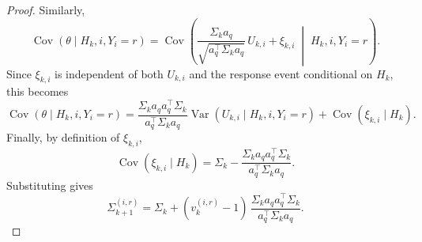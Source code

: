 \documentclass{article}
\begin{document}
\begin{proof}
Similarly,
\begin{equation*}
\operatorname{Cov}(\theta\mid H_k,i,Y_i=r)
=
\operatorname{Cov}\!\left(
\frac{\Sigma_k a_q}{\sqrt{a_q^\top\Sigma_k a_q}}\,U_{k,i}
+\xi_{k,i}
\;\middle|\;H_k,i,Y_i=r
\right).
\end{equation*}
Since $\xi_{k,i}$ is independent of both $U_{k,i}$ and the response event conditional on $H_k$,
this becomes
\begin{equation*}
\operatorname{Cov}(\theta\mid H_k,i,Y_i=r)
=
\frac{\Sigma_k a_q a_q^\top\Sigma_k}{a_q^\top\Sigma_k a_q}
\operatorname{Var}(U_{k,i}\mid H_k,i,Y_i=r)
+
\operatorname{Cov}(\xi_{k,i}\mid H_k).
\end{equation*}
Finally, by definition of $\xi_{k,i}$,
\begin{equation*}
\operatorname{Cov}(\xi_{k,i}\mid H_k)
=
\Sigma_k-
\frac{\Sigma_k a_q a_q^\top\Sigma_k}{a_q^\top\Sigma_k a_q}.
\end{equation*}
Substituting gives
\begin{equation*}
\Sigma_{k+1}^{(i,r)}
=
\Sigma_k+
(v_{k}^{(i,r)}-1)\,
\frac{\Sigma_k a_q a_q^\top\Sigma_k}{a_q^\top\Sigma_k a_q}.
\end{equation*}
\end{proof}
\newpage
\end{document}
